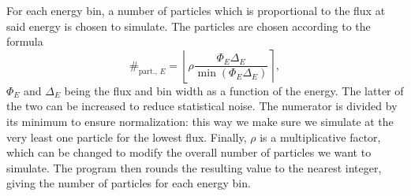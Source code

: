 For each energy bin, a number of particles which is proportional to the flux at said energy is chosen to simulate. The particles are chosen according to the formula
\begin{equation}
    \#_{\text{part., } E}=\left\lfloor \rho \frac{\Phi_E \Delta_E}{\min(\Phi_E \Delta_E)} \right\rceil,
\end{equation}
$\Phi_E$ and $\Delta_E$ being the flux and bin width as a function of the energy. The latter of the two can be increased to reduce statistical noise. The numerator is divided by its minimum to ensure normalization: this way we make sure we simulate at the very least one particle for the lowest flux. Finally, $\rho$ is a multiplicative factor, which can be changed to modify the overall number of particles we want to simulate. The program then rounds the resulting value to the nearest integer, giving the number of particles for each energy bin.


